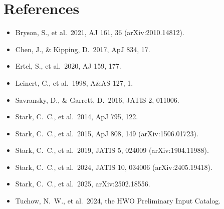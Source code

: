 \documentclass[11pt,a4paper]{article}
\begin{document}
\section*{References}
\small
\begin{itemize}
\item Bryson, S., et al.\ 2021, AJ 161, 36 (arXiv:2010.14812).
\item Chen, J., \& Kipping, D.\ 2017, ApJ 834, 17.
\item Ertel, S., et al.\ 2020, AJ 159, 177.
\item Leinert, C., et al.\ 1998, A\&AS 127, 1.
\item Savransky, D., \& Garrett, D.\ 2016, JATIS 2, 011006.
\item Stark, C.~C., et al.\ 2014, ApJ 795, 122.
\item Stark, C.~C., et al.\ 2015, ApJ 808, 149 (arXiv:1506.01723).
\item Stark, C.~C., et al.\ 2019, JATIS 5, 024009 (arXiv:1904.11988).
\item Stark, C.~C., et al.\ 2024, JATIS 10, 034006 (arXiv:2405.19418).
\item Stark, C.~C., et al.\ 2025, arXiv:2502.18556.
\item Tuchow, N.~W., et al.\ 2024, the HWO Preliminary Input Catalog.
\end{itemize}
\end{document}
